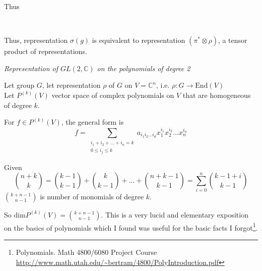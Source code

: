 \begin{enumerate}
	Thus 
	 \quad \quad \quad \, 
	Thus, representation $\sigma(g)$ is equivalent to representation $(\pi^*\otimes \rho)$, a tensor product of representations.  
	
\end{enumerate}

 \emph{Representation of $GL(2, \mathbb{C})$ on the polynomials of degree 2}

Let group $G$, let representation $\rho$ of $G$ on $V= \mathbb{C}^n$, i.e. $\rho : G \to \text{End}(V)$ \\
Let $P^{(k)}(V)$ vector space of complex polynomials on $V$ that are homogeneous of degree $k$. 

For $f\in P^{(k)}(V)$, the general form is 
\[
f = \sum_{ \substack{ i_1 + i_2 + \dots + i_n = k \\ 0 \leq i_j \leq k } } a_{i_1 i_2 \dots i_d} x_1^{i_1} x_2^{i_2} \dots x_n^{i_n}
\]

Given 
\[
\binom{n+k}{k} = \binom{k-1}{k-1} + \binom{k}{k-1} + \dots + \binom{n+k-1}{k-1} = \sum_{i=0}^n \binom{k-1+i}{k-1}
\]
$\binom{k+n-1}{n-1}$ is number of monomials of degree $k$.  

So $\text{dim}P^{(k)}(V) = \binom{k+n-1}{n-1}$.   This is a very lucid and elementary exposition on the basics of polynomials which I found was useful for the basic facts I forgot\footnote{Polynomials. Math 4800/6080 Project Course \url{http://www.math.utah.edu/~bertram/4800/PolyIntroduction.pdf}}.

